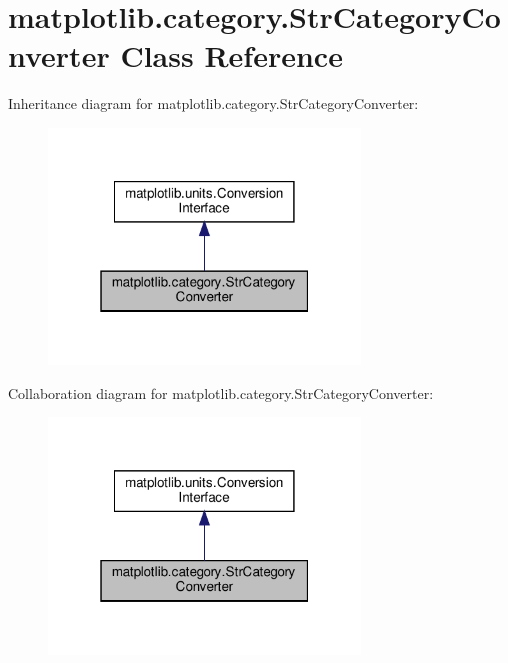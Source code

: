 \hypertarget{classmatplotlib_1_1category_1_1StrCategoryConverter}{}\section{matplotlib.\+category.\+Str\+Category\+Converter Class Reference}
\label{classmatplotlib_1_1category_1_1StrCategoryConverter}


Inheritance diagram for matplotlib.\+category.\+Str\+Category\+Converter\+:
\nopagebreak
\begin{figure}[H]
\begin{center}
\leavevmode
\includegraphics[width=235pt]{classmatplotlib_1_1category_1_1StrCategoryConverter__inherit__graph}
\end{center}
\end{figure}


Collaboration diagram for matplotlib.\+category.\+Str\+Category\+Converter\+:
\nopagebreak
\begin{figure}[H]
\begin{center}
\leavevmode
\includegraphics[width=235pt]{classmatplotlib_1_1category_1_1StrCategoryConverter__coll__graph}
\end{center}
\end{figure}
